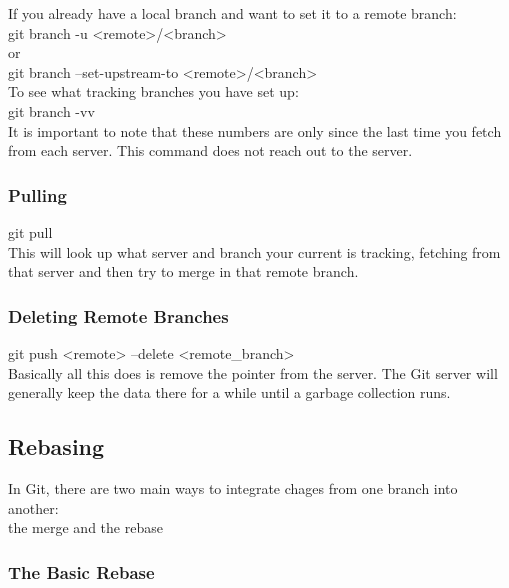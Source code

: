 \documentclass[11pt]{article}
\begin{document}
If you already have a local branch and want to set it to a remote branch:\\
git branch -u <remote>/<branch>\\
or\\
git branch --set-upstream-to <remote>/<branch>\\

To see what tracking branches you have set up:\\
git branch -vv\\
It is important to note that these numbers are only since the last time you fetch from each server. This command does not reach out to the server.\\

\subsubsection{Pulling}
\label{sec:org10f0792}
git pull\\

This will look up what server and branch your current is tracking, fetching from that server and then try to merge in that remote branch.\\

\subsubsection{Deleting Remote Branches}
\label{sec:org12add91}
git push <remote> --delete <remote\_branch>\\

Basically all this does is remove the pointer from the server. The Git server will generally keep the data there for a while until a garbage collection runs.\\






\subsection{Rebasing}
\label{sec:org88c2789}
In Git, there are two main ways to integrate chages from one branch into another:\\
the merge and the rebase\\

\subsubsection{The Basic Rebase}
\label{sec:org6502bf2}
\end{document}
